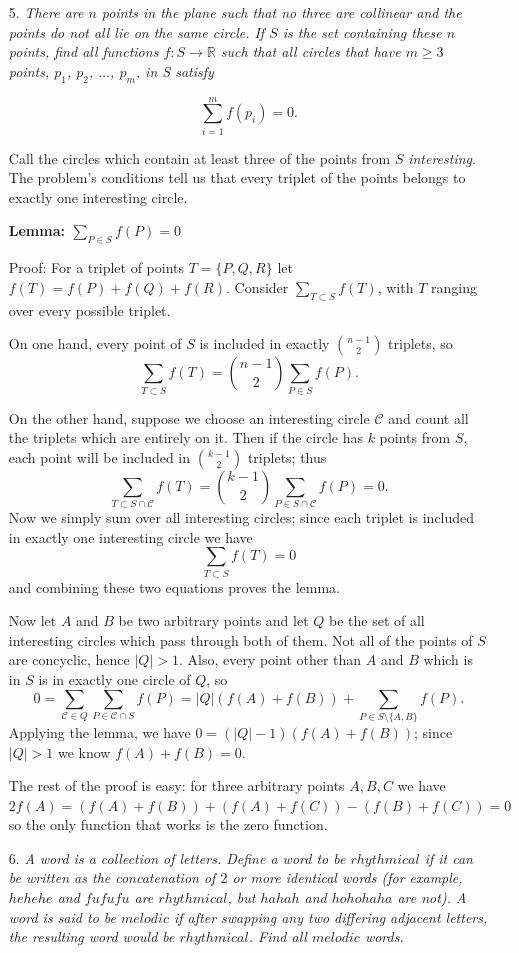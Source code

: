 \documentclass{article}
\begin{document}
\begin{enumerate}
\medskip
\item[5.] %
\textit{There are $n$ points in the plane such that no three are collinear and the points do not all lie on the same circle. If $S$ is the set containing these $n$ points, find all functions $f : S \rightarrow \mathbb{R}$ such that all circles that have $m \ge 3$ points, $p_1$, $p_2$, $\dots$, $p_m$, in S satisfy}

$$\sum_{i = 1}^{m} f(p_i) = 0.$$

Call the circles which contain at least three of the points from $S$ \textit{interesting}. The problem's conditions tell us that every triplet of the points belongs to exactly one interesting circle.

\textbf{Lemma: $\sum_{P\in S} f(P) = 0$}

Proof: For a triplet of points $T = \{P, Q, R\}$ let $f(T) = f(P) + f(Q) + f(R)$. Consider $\sum_{T\subset S} f(T)$, with $T$ ranging over every possible triplet.

On one hand, every point of $S$ is included in exactly $\binom{n-1}{2}$ triplets, so \[ \sum_{T\subset S} f(T) = \binom{n-1}{2}\sum_{P\in S} f(P). \]

On the other hand, suppose we choose an interesting circle $\mathcal{C}$ and count all the triplets which are entirely on it. Then if the circle has $k$ points from $S$, each point will be included in $\binom{k-1}{2}$ triplets; thus \[ \sum_{T\subset S\cap\mathcal{C}} f(T) = \binom{k-1}{2} \sum_{P\in S\cap\mathcal{C}} f(P) = 0. \] Now we simply sum over all interesting circles; since each triplet is included in exactly one interesting circle we have \[ \sum_{T\subset S} f(T) = 0 \] and combining these two equations proves the lemma.

Now let $A$ and $B$ be two arbitrary points and let $Q$ be the set of all interesting circles which pass through both of them. Not all of the points of $S$ are concyclic, hence $|Q| > 1$. Also, every point other than $A$ and $B$ which is in $S$ is in exactly one circle of $Q$, so \[ 0 = \sum_{\mathcal{C}\in Q}\sum_{P\in \mathcal{C}\cap S} f(P) = |Q|(f(A) + f(B)) + \sum_{P\in S\setminus\{A, B\}} f(P). \]
Applying the lemma, we have $0 = (|Q|-1)(f(A) + f(B))$; since $|Q| > 1$ we know $f(A) + f(B) = 0$.

The rest of the proof is easy: for three arbitrary points $A, B, C$ we have $2f(A) = (f(A) + f(B)) + (f(A) + f(C)) - (f(B) + f(C)) = 0$ so the only function that works is the zero function.

\medskip
\item[6.] %
\textit{A word is a collection of letters. Define a word to be $rhythmical$ if it can be written as the concatenation of $2$ or more identical words (for example, $hehehe$ and $fufufu$ are $rhythmical$, but $hahah$ and $hohohaha$ are not). A word is said to be $melodic$ if after swapping any two differing adjacent letters, the resulting word would be $rhythmical$. Find all $melodic$ words.}


\end{enumerate}
\end{document}
